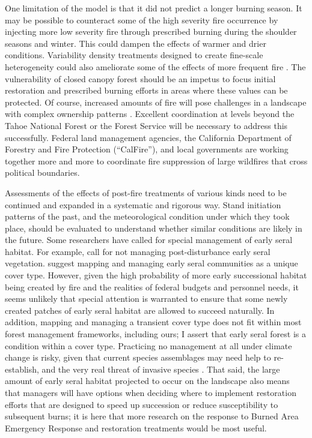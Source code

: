 One limitation of the model is that it did not predict a longer burning season. It may be possible to counteract some of the high severity fire occurrence by injecting more low severity fire through prescribed burning during the shoulder seasons and winter. This could dampen the effects of warmer and drier conditions. Variability density treatments designed to create fine-scale heterogeneity could also ameliorate some of the effects of more frequent fire \citep{Stephens2010,Knapp2012,North2012a}. The vulnerability of closed canopy forest should be an impetus to focus initial restoration and prescribed burning efforts in areas where these values can be protected. Of course, increased amounts of fire will pose challenges in a landscape with complex ownership patterns \citep{Stephens2013}. Excellent coordination at levels beyond the Tahoe National Forest or the Forest Service will be necessary to address this successfully. Federal land management agencies, the California Department of Forestry and Fire Protection (``CalFire''), and local governments are working together more and more to coordinate fire suppression of large wildfires that cross political boundaries.

Assessments of the effects of post-fire treatments of various kinds need to be continued and expanded in a systematic and rigorous way. Stand initiation patterns of the past, and the meteorological condition under which they took place, should be evaluated to understand whether similar conditions are likely in the future. Some researchers have called for special management of early seral habitat. For example, \citet{Dellasala2014} call for not managing post-disturbance early seral vegetation. \citet{Swanson2011} suggest mapping and managing early seral communities as a unique cover type. However, given the high probability of more early successional habitat being created by fire and the realities of federal budgets and personnel needs, it seems unlikely that special attention is warranted to ensure that some newly created patches of early seral habitat are allowed to succeed naturally. In addition, mapping and managing a transient cover type does not fit within most forest management frameworks, including ours; I assert that early seral forest is a condition within a cover type. Practicing no management at all under climate change is risky, given that current species assemblages may need help to re-establish, and the very real threat of invasive species \citep{Stephens2010}. That said, the large amount of early seral habitat projected to occur on the landscape also means that managers will have options when deciding where to implement restoration efforts that are designed to speed up succession or reduce susceptibility to subsequent burns; it is here that more research on the response to Burned Area Emergency Response and restoration treatments would be most useful.



